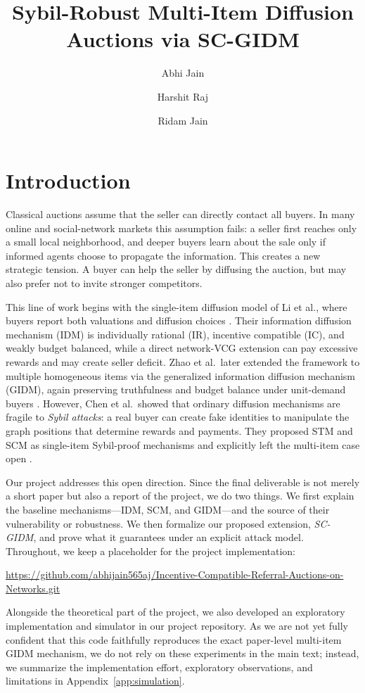 \documentclass[sigconf]{aamas}
\title[Sybil-Robust Multi-Item Diffusion Auctions]{Sybil-Robust Multi-Item Diffusion Auctions via SC-GIDM}
\author{Abhi Jain}
\affiliation{%
  \institution{Indian Institute of Technology Bombay}
  \city{Mumbai}
  \country{India}}
\author{Harshit Raj}
\affiliation{%
  \institution{Indian Institute of Technology Bombay}
  \city{Mumbai}
  \country{India}}
\author{Ridam Jain}
\affiliation{%
  \institution{Indian Institute of Technology Bombay}
  \city{Mumbai}
  \country{India}}
\theoremstyle{definition}
\theoremstyle{remark}
\begin{document}
\maketitle

\section{Introduction}
Classical auctions assume that the seller can directly contact all buyers. In many online and social-network markets this assumption fails: a seller first reaches only a small local neighborhood, and deeper buyers learn about the sale only if informed agents choose to propagate the information. This creates a new strategic tension. A buyer can help the seller by diffusing the auction, but may also prefer not to invite stronger competitors.

This line of work begins with the single-item diffusion model of Li et al., where buyers report both valuations and diffusion choices \cite{LiHZZ17}. Their information diffusion mechanism (IDM) is individually rational (IR), incentive compatible (IC), and weakly budget balanced, while a direct network-VCG extension can pay excessive rewards and may create seller deficit. Zhao et al.\ later extended the framework to multiple homogeneous items via the generalized information diffusion mechanism (GIDM), again preserving truthfulness and budget balance under unit-demand buyers \cite{ZhaoLXHJ18}. However, Chen et al.\ showed that ordinary diffusion mechanisms are fragile to \emph{Sybil attacks}: a real buyer can create fake identities to manipulate the graph positions that determine rewards and payments. They proposed STM and SCM as single-item Sybil-proof mechanisms and explicitly left the multi-item case open \cite{ChenDWWZ23}.

Our project addresses this open direction. Since the final deliverable is not merely a short paper but also a report of the project, we do two things. We first explain the baseline mechanisms---IDM, SCM, and GIDM---and the source of their vulnerability or robustness. We then formalize our proposed extension, \emph{SC-GIDM}, and prove what it guarantees under an explicit attack model. Throughout, we keep a placeholder for the project implementation:
\begin{center}
\url{https://github.com/abhijain565aj/Incentive-Compatible-Referral-Auctions-on-Networks.git}
\end{center}

Alongside the theoretical part of the project, we also developed an exploratory implementation and simulator in our project repository. As we are not yet fully confident that this code faithfully reproduces the exact paper-level multi-item GIDM mechanism, we do not rely on these experiments in the main text; instead, we summarize the implementation effort, exploratory observations, and limitations in Appendix~\ref{app:simulation}.
\end{document}
